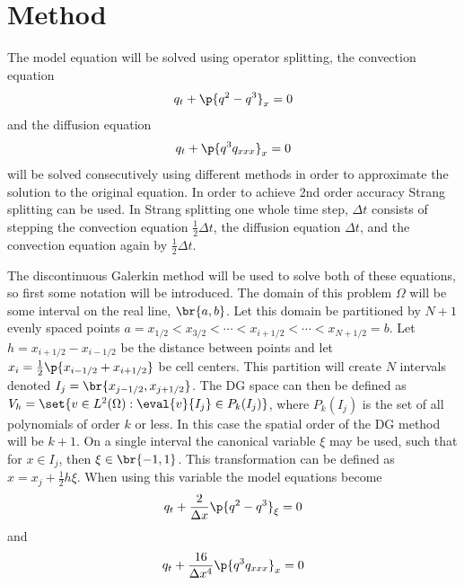 \documentclass[11pt, oneside]{article}
\begin{document}
\section{Method}
  The model equation will be solved using operator splitting, the convection
  equation
  \[
    q_t + \p{q^2 - q^3}_x = 0
  \]
  and the diffusion equation
  \[
    q_t + \p{q^3 q_{xxx}}_x = 0
  \]
  will be solved consecutively using different methods in order to
  approximate the solution to the original equation.
  In order to achieve 2nd order accuracy Strang splitting can be used.
  In Strang splitting one whole time step, $\Delta t$ consists of stepping the
  convection equation $\frac{1}{2}\Delta t$, the diffusion equation $\Delta t$,
  and the convection equation again by $\frac{1}{2}\Delta t$.

  The discontinuous Galerkin method will be used to solve both of these
  equations, so first some notation will be introduced.
  The domain of this problem $\Omega$ will be some interval on the real line,
  $\br{a, b}$.
  Let this domain be partitioned by $N+1$ evenly spaced points
  $a = x_{1/2} < x_{3/2} < \cdots < x_{i+1/2} < \cdots < x_{N+1/2} = b$.
  Let $h = x_{i+1/2} - x_{i-1/2}$ be the distance between points and let
  $x_i = \frac{1}{2}\p{x_{i-1/2} + x_{i+1/2}}$ be cell centers.
  This partition will create $N$ intervals denoted
  $I_j = \br{x_{j-1/2}, x_{j+1/2}}$.
  The DG space can then be defined as
  $V_h = \set{v \in L^2(\Omega): \eval{v}{I_j} \in P_k(I_j)}$, where $P_k(I_j)$
  is the set of all  polynomials of order $k$ or less.
  In this case the spatial order of the DG method will be $k+1$.
  On a single interval the canonical variable $\xi$ may be used, such that for
  $x \in I_j$, then $\xi \in \br{-1, 1}$.
  This transformation can be defined as $x = x_j + \frac{1}{2}h\xi$.
  When using this variable the model equations become
  \[
    q_t + \frac{2}{\Delta x} \p{q^2 - q^3}_\xi = 0
  \]
  and
  \[
    q_t + \frac{16}{\Delta x^4} \p{q^3 q_{xxx}}_x = 0
  \]
\end{document}

